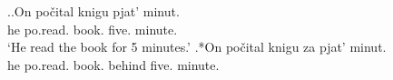 \ex.\label{ex:pobrosal}\ag.\label{ex:pobrosal:delim}On po\v{c}ital knigu pjat' minut.\\
he po.read. book. five. minute.\\
\trans `He read the book for 5 minutes.'
\bg.*On po\v{c}ital knigu za pjat' minut.\\
he po.read. book. behind five. minute.\\


%
%
%

